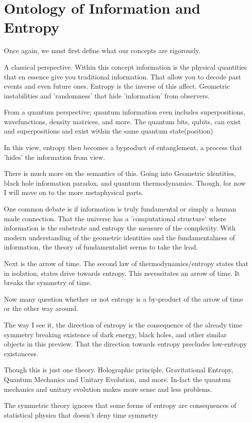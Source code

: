 \section{Ontology of Information and Entropy}
\par Once again, we must first define what our concepts are rigorously.
\par A classical perspective. Within this concept information is the physical quantities that en essence give you traditional information. That allow you to decode past events and even future ones. Entropy is the inverse of this affect. Geometric instabilities and 'randomness' that hide 'information' from observers. 
\par From a quantum perspective; quantum information even includes superpositions, wavefunctions, density matrices, and more. The quantum bits, qubits, can exist and superpositions and exist within the same quantum state(position)
\par In this view, entropy then becomes a byproduct of entanglement, a process that 'hides' the information from view.
\par There is much more on the semantics of this. Going into Geometric identities, black hole information paradox, and quantum thermodynamics. Though, for now I will move on to the more metaphysical parts.
\par One common debate is if information is truly fundamental or simply a human made connection. That the universe has a 'computational structure' where information is the substrate and entropy the measure of the complexity. With modern understanding of the geometric identities and the fundamentalness of information, the theory of fundamentalist seems to take the lead.
\par Next is the arrow of time. The second law of thermodynamics/entropy states that in isolation, states drive towards entropy. This necessitates an arrow of time. It breaks the symmetry of time. 
\par Now many question whether or not entropy is a by-product of the arrow of time or the other way around.
\par The way I see it, the direction of entropy is the consequence of the already time symmetry breaking existence of dark energy, black holes, and other similar objects in this preview. That the direction towards entropy precludes low-entropy existancess.
\par Though this is just one theory. Holographic principle, Gravitational Entropy, Quantum Mechanics and Unitary Evolution, and more. In-fact the quantum mechanics and unitary evolution makes more sense and less problems.
\par The symmetric theory ignores that some forms of entropy are consequences of statistical physics that doesn't deny time symmetry
